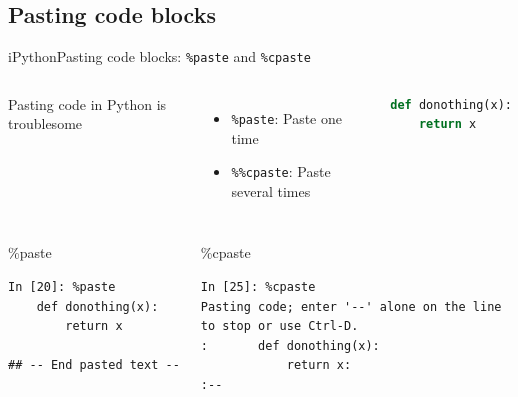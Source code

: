 \documentclass[10pt,compress]{beamer} %
\begin{document}
\subsection{Pasting code blocks}
\begin{frame}[fragile]{iPython}{Pasting code blocks: \texttt{\%paste} and \texttt{\%cpaste}}
    \begin{columns}
	   Pasting code in Python is troublesome
		\begin{itemize}
			\item \texttt{\%paste}: Paste one time
			\item \texttt{\%\%cpaste}: Paste several times
		\end{itemize}
	   \begin{exampleblock}{}
	   \vspace{-0.2cm}
		\begin{lstlisting}[language=Python]
def donothing(x):
    return x
\end{lstlisting}
	   \vspace{-0.2cm}
	   \end{exampleblock}

	   \vspace{-0.2cm}
	\end{columns}

	\footnotesize{
    \begin{columns}
		 \begin{exampleblock}{\footnotesize{\%paste}}
	   \vspace{-0.2cm}
	   \begin{verbatim}
In [20]: %paste
    def donothing(x):
        return x

## -- End pasted text --
\end{verbatim}
	   \vspace{-0.2cm}
	   \end{exampleblock}

	   \vspace{-0.2cm}


	 	\begin{exampleblock}{\footnotesize{\%cpaste}}
	   \vspace{-0.2cm}
	   \begin{verbatim}
In [25]: %cpaste
Pasting code; enter '--' alone on the line
to stop or use Ctrl-D.
:       def donothing(x):
            return x:
:--
\end{verbatim}
	   \vspace{-0.2cm}
	   \end{exampleblock}
	   \end{columns}
	   }
\end{frame}
\end{document}
